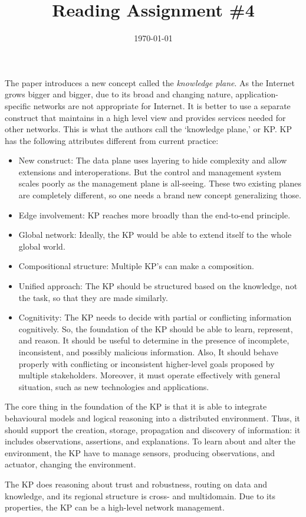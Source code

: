 \documentclass{homework}
\title{Reading Assignment \#4}
\date{\today}
\begin{document}
\maketitle


The paper introduces a new concept called the \emph{knowledge plane}. As the Internet grows bigger and bigger, due to its broad and changing nature, application-specific networks are not appropriate for Internet. It is better to use a separate construct that maintains in a high level view and provides services needed for other networks. This is what the authors call the `knowledge plane,' or KP. KP has the following attributes different from current practice:
\begin{itemize}
  \item New construct: The data plane uses layering to hide complexity and allow extensions and interoperations. But the control and management system scales poorly as the management plane is all-seeing. These two existing planes are completely different, so one needs a brand new concept generalizing those.
  \item Edge involvement: KP reaches more broadly than the end-to-end principle.
  \item Global network: Ideally, the KP would be able to extend itself to the whole global world.
  \item Compositional structure: Multiple KP's can make a composition.
  \item Unified approach: The KP should be structured based on the knowledge, not the task, so that they are made similarly.
  \item Cognitivity: The KP needs to decide with partial or conflicting information cognitively. So, the foundation of the KP should be able to learn, represent, and reason. It should be useful to determine in the presence of incomplete, inconsistent, and possibly malicious information. Also, It should behave properly with conflicting or inconsistent higher-level goals proposed by multiple stakeholders. Moreover, it must operate effectively with general situation, such as new technologies and applications.
\end{itemize}

The core thing in the foundation of the KP is that it is able to integrate behavioural models and logical reasoning into a distributed environment. Thus, it should support the creation, storage, propagation and discovery of information: it includes observations, assertions, and explanations. To learn about and alter the environment, the KP have to manage sensors, producing observations, and actuator, changing the environment.

The KP does reasoning about trust and robustness, routing on data and knowledge, and its regional structure is cross- and multidomain. Due to its properties, the KP can be a high-level network management.
\end{document}
